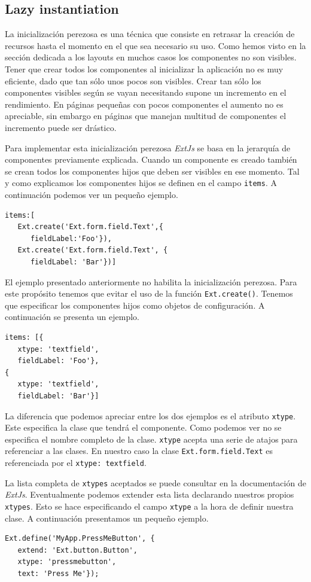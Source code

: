	\subsection{Lazy instantiation}
		La inicialización perezosa es una técnica que consiste en retrasar la creación de recursos hasta el momento en el que sea necesario su
		uso. Como hemos visto en la sección dedicada a los layouts en muchos casos los componentes no son visibles. Tener que crear todos los
		componentes al inicializar la aplicación no es muy eficiente, dado que tan sólo unos pocos son visibles. Crear tan sólo los
		componentes visibles según se vayan necesitando supone un incremento en el rendimiento. En páginas pequeñas con pocos componentes el
		aumento no es apreciable, sin embargo en páginas que manejan multitud de componentes el incremento puede ser drástico. 
		\par
		Para implementar esta inicialización perezosa \emph{ExtJs} se basa en la jerarquía de componentes previamente explicada. Cuando un componente
		es creado también se crean todos los componentes hijos que deben ser visibles en ese momento. Tal y como explicamos los componentes
		hijos se definen en el campo \texttt{items}. A continuación podemos ver un pequeño ejemplo. 
		\begin{lstlisting}[style=myJs]
items:[
   Ext.create('Ext.form.field.Text',{
      fieldLabel:'Foo'}),
   Ext.create('Ext.form.field.Text', {
      fieldLabel: 'Bar'})]
		\end{lstlisting}
		\par
		El ejemplo presentado anteriormente no habilita la inicialización perezosa. Para este propósito tenemos que evitar el uso de la
		función \texttt{Ext.create()}. Tenemos que especificar los componentes hijos como objetos de configuración. A continuación se presenta
		un ejemplo.
		\begin{lstlisting}[style=myJs]
items: [{
   xtype: 'textfield',
   fieldLabel: 'Foo'},
{
   xtype: 'textfield',
   fieldLabel: 'Bar'}]
		\end{lstlisting}
		\par
		La diferencia que podemos apreciar entre los dos ejemplos es el atributo \texttt{xtype}. Este especifica la clase que tendrá el
		componente.  Como podemos ver no se especifica el nombre completo de la clase. \texttt{xtype} acepta una serie de atajos para
		referenciar a las clases. En nuestro caso la clase \texttt{Ext.form.field.Text} es referenciada por el \texttt{xtype:\cc
		textfield\cc}.
		\par
		La lista completa de \texttt{xtypes} aceptados se puede consultar en la documentación de \emph{ExtJs}\cite{ExtJsDoc}. Eventualmente podemos
		extender esta lista declarando nuestros propios \texttt{xtypes}. Esto se hace especificando el campo \texttt{xtype} a la hora de
		definir nuestra clase. A continuación presentamos un pequeño ejemplo.
		\begin{lstlisting}[style=myJs]
Ext.define('MyApp.PressMeButton', {
   extend: 'Ext.button.Button',
   xtype: 'pressmebutton',
   text: 'Press Me'});
		\end{lstlisting}

